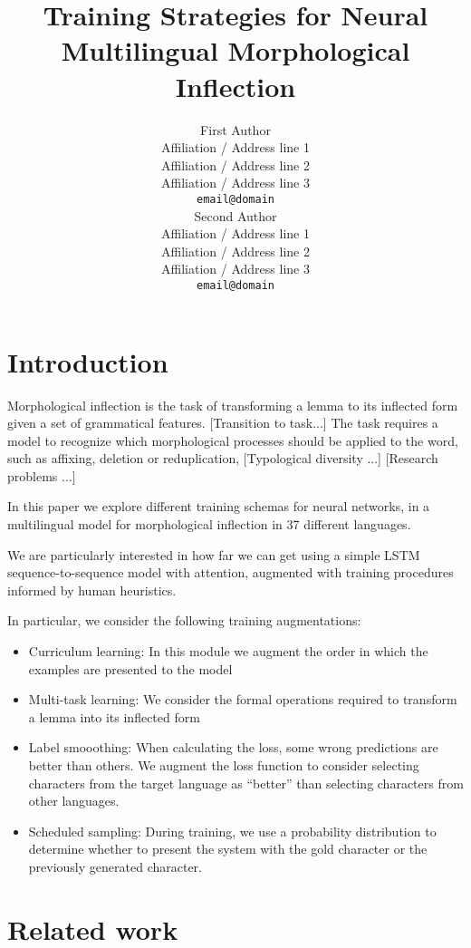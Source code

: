 \documentclass[11pt,a4paper]{article}
\title{Training Strategies for Neural Multilingual Morphological Inflection}
\author{First Author \\
  Affiliation / Address line 1 \\
  Affiliation / Address line 2 \\
  Affiliation / Address line 3 \\
  \texttt{email@domain} \\\And
  Second Author \\
  Affiliation / Address line 1 \\
  Affiliation / Address line 2 \\
  Affiliation / Address line 3 \\
  \texttt{email@domain} \\}
\date{}
\begin{document}
\maketitle
\begin{abstract}
\end{abstract}

\section{Introduction}

Morphological inflection is the task of transforming a lemma to its
inflected form given a set of grammatical features. 
[Transition to task...]
The task requires a model to recognize which morphological processes
should be applied to the word, such as affixing, deletion or
reduplication, 
[Typological diversity ...]
[Research problems ...]

In this paper we explore different training schemas for neural
networks, in a multilingual model for morphological inflection in 37
different languages.

We are particularly interested in how far we can get using a simple
LSTM sequence-to-sequence model with attention, augmented with
training procedures informed by human heuristics.

In particular, we consider the following training augmentations:

\begin{itemize}
\item Curriculum learning: In this module we augment the order in which the examples are presented to the model
\item Multi-task learning: We consider the formal operations required to transform a lemma into its inflected form
\item Label smooothing: When calculating the loss, some wrong predictions are better than others. We augment the loss function to consider selecting characters from the target language as ``better'' than selecting characters from other languages.
\item Scheduled sampling: During training, we use a probability distribution to determine whether to present the system with the gold character or the previously generated character.
\end{itemize}

\section{Related work}
\end{document}
